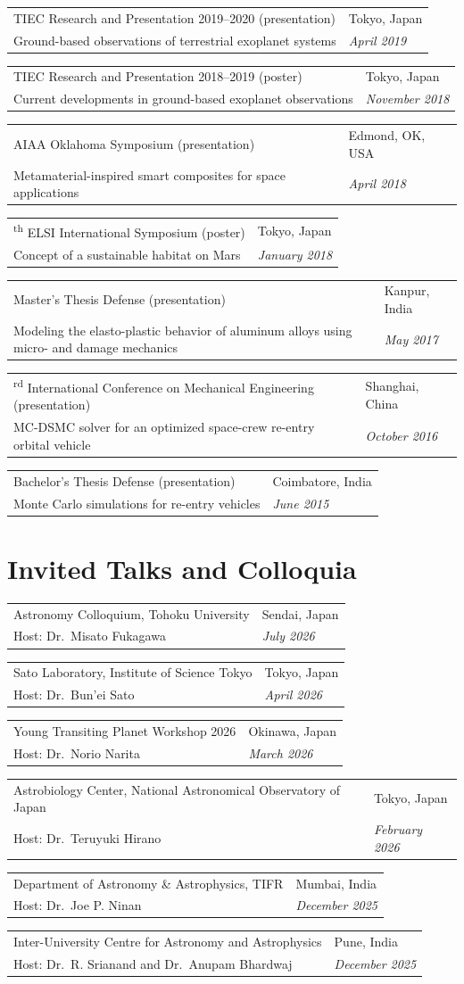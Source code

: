 \documentclass[10pt,a4paper]{article}
\makeatletter
\newcommand{\presentationentry}[4]{%
\begin{tabularx}{\textwidth}{
    @{}
    >{\raggedright\arraybackslash}X
    >{\raggedleft\arraybackslash}p{4.0cm}
    @{}
}
#1 & #2 \\
\textcolor{entrylight}{#3} &
\textcolor{entrylight}{\emph{#4}}
\end{tabularx}
\vspace{2pt}
}
\newcommand{\invitedtalkentry}[4]{%
\begin{tabularx}{\textwidth}{
    @{}
    >{\raggedright\arraybackslash}X
    >{\raggedleft\arraybackslash}p{4.5cm}
    @{}
}
#1 & #2 \\
\textcolor{entrylight}{Host: #3} &
\textcolor{entrylight}{\emph{#4}}
\end{tabularx}
\vspace{2pt}
}
\makeatother
\begin{document}
\presentationentry
{TIEC Research and Presentation 2019--2020 (presentation)}
{Tokyo, Japan}
{Ground-based observations of terrestrial exoplanet systems}
{April 2019}

\presentationentry
{TIEC Research and Presentation 2018--2019 (poster)}
{Tokyo, Japan}
{Current developments in ground-based exoplanet observations}
{November 2018}

\presentationentry
{AIAA Oklahoma Symposium (presentation)}
{Edmond, OK, USA}
{Metamaterial-inspired smart composites for space applications}
{April 2018}

\presentationentry
{6\textsuperscript{th} ELSI International Symposium (poster)}
{Tokyo, Japan}
{Concept of a sustainable habitat on Mars}
{January 2018}

\presentationentry
{Master's Thesis Defense (presentation)}
{Kanpur, India}
{Modeling the elasto-plastic behavior of aluminum alloys using micro- and damage mechanics}
{May 2017}

\presentationentry
{3\textsuperscript{rd} International Conference on Mechanical Engineering (presentation)}
{Shanghai, China}
{MC-DSMC solver for an optimized space-crew re-entry orbital vehicle}
{October 2016}

\presentationentry
{Bachelor's Thesis Defense (presentation)}
{Coimbatore, India}
{Monte Carlo simulations for re-entry vehicles}
{June 2015}


\section{Invited Talks and Colloquia}

\invitedtalkentry
{Astronomy Colloquium, Tohoku University}
{Sendai, Japan}
{Dr.\ Misato Fukagawa}
{July 2026}

\invitedtalkentry
{Sato Laboratory, Institute of Science Tokyo}
{Tokyo, Japan}
{Dr.\ Bun'ei Sato}
{April 2026}

\invitedtalkentry
{Young Transiting Planet Workshop 2026}
{Okinawa, Japan}
{Dr.\ Norio Narita}
{March 2026}

\invitedtalkentry
{Astrobiology Center, National Astronomical Observatory of Japan}
{Tokyo, Japan}
{Dr.\ Teruyuki Hirano}
{February 2026}

\invitedtalkentry
{Department of Astronomy \& Astrophysics, TIFR}
{Mumbai, India}
{Dr.\ Joe P. Ninan}
{December 2025}

\invitedtalkentry
{Inter-University Centre for Astronomy and Astrophysics}
{Pune, India}
{Dr.\ R. Srianand and Dr.\ Anupam Bhardwaj}
{December 2025}
\end{document}
